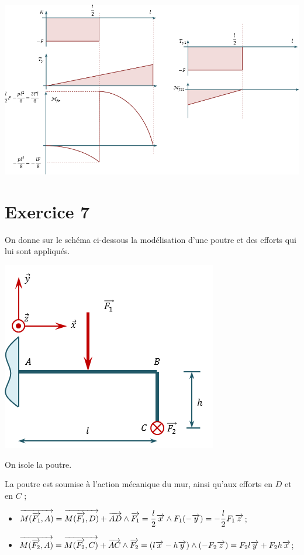 \documentclass[10pt,fleqn]{article} %
\begin{document}
\begin{multicols}{1}
\begin{corrige}
\begin{center}
\includegraphics[width=.95\linewidth]{images/exo_03_corr_03}
\end{center}
\end{corrige}
\else 
\fi



\section*{Exercice 7}
\setcounter{subparagraph}{0}
On donne sur le schéma ci-dessous la modélisation d'une poutre et des efforts qui lui sont appliqués.
\begin{center}
\includegraphics[width=.45\textwidth]{images/exo_07}
\end{center}



On isole la poutre.

La poutre est soumise à l'action mécanique du mur, ainsi qu'aux efforts en $D$ et en $C$ ;
\begin{itemize}
\item $\overrightarrow{M(\overrightarrow{F_1},A)} 
= \overrightarrow{M(\overrightarrow{F_1},D)}+\overrightarrow{AD}\wedge\overrightarrow{F_1}
= \dfrac{l}{2}\overrightarrow{x} \wedge F_1 (-\overrightarrow{y})
= -\dfrac{l}{2}F_1  \overrightarrow{z} $;
\item $\overrightarrow{M(\overrightarrow{F_2},A)} 
= \overrightarrow{M(\overrightarrow{F_2},C)}+\overrightarrow{AC}\wedge\overrightarrow{F_2}
= \left(l\overrightarrow{x} - h\overrightarrow{y} \right) \wedge\left(-F_2\overrightarrow{z}\right)
= F_2l\overrightarrow{y} +F_2h\overrightarrow{x} $;
\end{itemize}


\end{multicols}
\end{document}
